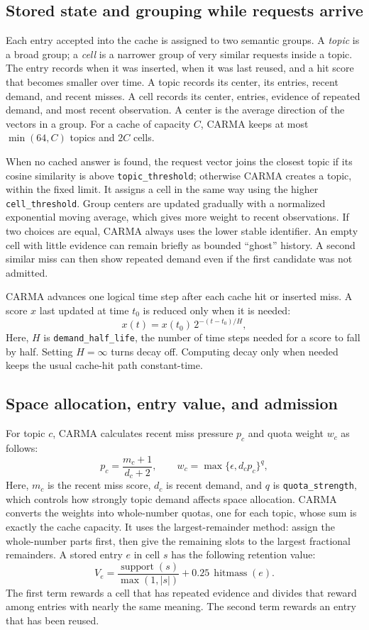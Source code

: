 \documentclass[10pt,letterpaper]{article}
\newcommand{\code}[1]{\texttt{#1}}
\begin{document}
\subsection{Stored state and grouping while requests arrive}

Each entry accepted into the cache is assigned to two semantic groups. A
\emph{topic} is a broad group; a \emph{cell} is a narrower group of very
similar requests inside a topic. The entry records when it was inserted, when
it was last reused, and a hit score that becomes smaller over time. A topic
records its center, its entries, recent demand, and recent misses. A cell
records its center, entries, evidence of repeated demand, and most recent
observation. A center is the average direction of the vectors in a group. For
a cache of capacity $C$, CARMA keeps at most $\min(64,C)$ topics and $2C$
cells.

When no cached answer is found, the request vector joins the closest topic if
its cosine similarity is above \code{topic\_threshold}; otherwise CARMA creates
a topic, within the fixed limit. It assigns a cell in the same way using the
higher \code{cell\_threshold}. Group centers are updated gradually with a
normalized exponential moving average, which gives more weight to recent
observations. If two choices are equal, CARMA always uses the lower stable
identifier. An empty cell with little evidence can remain briefly as bounded
``ghost'' history. A second similar miss can then show repeated demand even if
the first candidate was not admitted.

CARMA advances one logical time step after each cache hit or inserted miss. A
score $x$ last updated at time $t_0$ is reduced only when it is needed:
\[
  x(t)=x(t_0)\,2^{-(t-t_0)/H},
\]
Here, $H$ is \code{demand\_half\_life}, the number of time steps needed for a
score to fall by half. Setting $H=\infty$ turns decay off. Computing decay only
when needed keeps the usual cache-hit path constant-time.

\subsection{Space allocation, entry value, and admission}

For topic $c$, CARMA calculates recent miss pressure $p_c$ and quota weight
$w_c$ as follows:
\[
  p_c=\frac{m_c+1}{d_c+2},\qquad
  w_c=\max\{\epsilon,d_c p_c\}^{q},
\]
Here, $m_c$ is the recent miss score, $d_c$ is recent demand, and $q$ is
\code{quota\_strength}, which controls how strongly topic demand affects space
allocation. CARMA converts the weights into whole-number quotas, one for each
topic, whose sum is exactly the cache capacity. It uses the largest-remainder
method: assign the whole-number parts first, then give the remaining slots to
the largest fractional remainders. A stored entry $e$ in cell $s$ has the
following retention value:
\[
  V_e=\frac{\operatorname{support}(s)}{\max(1,|s|)}
      +0.25\,\operatorname{hitmass}(e).
\]
The first term rewards a cell that has repeated evidence and divides that
reward among entries with nearly the same meaning. The second term rewards an
entry that has been reused.
\end{document}
